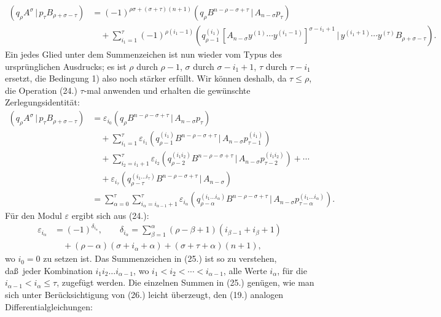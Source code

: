 \documentclass[11pt]{article}
\providecommand{\pair}[2]{(#1\,|\,#2)}
\providecommand{\eps}{\varepsilon}
\begin{document}
\begin{equation}
\begin{aligned}
\pair{q_\rho A^\sigma}{p_\tau B_{\rho+\sigma-\tau}}
&=(-1)^{\rho\sigma+(\sigma+\tau)(n+1)}
  \pair{q_\rho B^{n-\rho-\sigma+\tau}}{A_{n-\sigma}p_\tau}\\
&\quad+\sum_{i_1=1}^{\tau}(-1)^{\rho(i_1-1)}
 \pair{q_{\rho-1}^{(i_1)}[A_{n-\sigma}y^{(1)}\cdots y^{(i_1-1)}]^{\sigma-i_1+1}}
 {y^{(i_1+1)}\cdots y^{(\tau)}B_{\rho+\sigma-\tau}}.
\end{aligned}
\tag{24}
\end{equation}
Ein jedes Glied unter dem Summenzeichen ist nun wieder vom Typus des urspr\"unglichen Ausdrucks; es ist $\rho$ durch $\rho-1$, $\sigma$ durch $\sigma-i_1+1$, $\tau$ durch $\tau-i_1$ ersetzt, die Bedingung 1) also noch st\"arker erf\"ullt. Wir k\"onnen deshalb, da $\tau\le\rho$, die Operation (24.) $\tau$-mal anwenden und erhalten die gew\"unschte Zerlegungsidentit\"at:
\begin{equation}
\begin{aligned}
\pair{q_\rho A^\sigma}{p_\tau B_{\rho+\sigma-\tau}}
&=\eps_{i_0}\pair{q_\rho B^{n-\rho-\sigma+\tau}}{A_{n-\sigma}p_\tau}\\
&\quad+\sum_{i_1=1}^{\tau}\eps_{i_1}
 \pair{q_{\rho-1}^{(i_1)}B^{n-\rho-\sigma+\tau}}{A_{n-\sigma}p_{\tau-1}^{(i_1)}}\\
&\quad+\sum_{i_2=i_1+1}^{\tau}\eps_{i_2}
 \pair{q_{\rho-2}^{(i_1i_2)}B^{n-\rho-\sigma+\tau}}{A_{n-\sigma}p_{\tau-2}^{(i_1i_2)}}+\cdots\\
&\quad+\eps_{i_\tau}\pair{q_{\rho-\tau}^{(i_1\ldots i_\tau)}B^{n-\rho-\sigma+\tau}}{A_{n-\sigma}}\\
&=\sum_{\alpha=0}^{\tau}\sum_{i_\alpha=i_{\alpha-1}+1}^{\tau}\eps_{i_\alpha}
 \pair{q_{\rho-\alpha}^{(i_1\ldots i_\alpha)}B^{n-\rho-\sigma+\tau}}{A_{n-\sigma}p_{\tau-\alpha}^{(i_1\ldots i_\alpha)}}.
\end{aligned}
\tag{25}
\end{equation}
F\"ur den Modul $\eps$ ergibt sich aus (24.):
\begin{equation}
\begin{aligned}
\eps_{i_\alpha}&=(-1)^{\delta_{i_\alpha}},\qquad
\delta_{i_\alpha}=\sum_{\beta=1}^{\alpha}(\rho-\beta+1)(i_{\beta-1}+i_\beta+1)\\
&\quad +(\rho-\alpha)(\sigma+i_\alpha+\alpha)+(\sigma+\tau+\alpha)(n+1),
\end{aligned}
\tag{26}
\end{equation}
wo $i_0=0$ zu setzen ist. Das Summenzeichen in (25.) ist so zu verstehen, da\ss\ jeder Kombination $i_1i_2\ldots i_{\alpha-1}$, wo $i_1<i_2<\cdots<i_{\alpha-1}$, alle Werte $i_\alpha$, f\"ur die $i_{\alpha-1}<i_\alpha\le\tau$, zugef\"ugt werden. Die einzelnen Summen in (25.) gen\"ugen, wie man sich unter Ber\"ucksichtigung von (26.) leicht \"uberzeugt, den (19.) analogen Differentialgleichungen:
\end{document}
